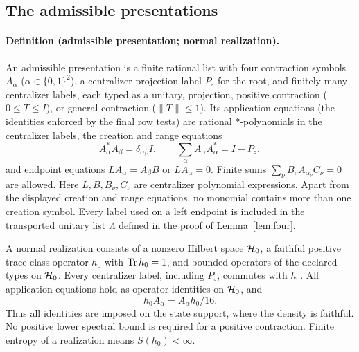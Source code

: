 \subsection{The admissible presentations}\label{sec:admissible}
\paragraph{Definition (admissible presentation; normal realization).}
An admissible presentation is a finite rational list with four contraction
symbols $A_\alpha$ ($\alpha\in\{0,1\}^2$), a centralizer projection label $P_{\circ}$ for the root, and
finitely many centralizer labels, each typed as a unitary, projection,
positive contraction ($0\leq T\leq I$), or general contraction ($\|T\|\leq1$).
Its application equations (the identities enforced by the final row tests) are rational $*$-polynomials in the centralizer
labels, the creation and range equations
\[
 A_\alpha^*A_\beta=\delta_{\alpha\beta}I,\qquad
 \sum_\alpha A_\alpha A_\alpha^*=I-P_{\circ},
\]
and endpoint equations $LA_\alpha=A_\beta B$ or $LA_\alpha=0$.
Finite sums $\sum_\nu B_\nu A_{\alpha_\nu}C_\nu=0$ are allowed.
Here $L,B,B_\nu,C_\nu$ are centralizer polynomial expressions. Apart from the displayed creation and range equations, no monomial contains
more than one creation symbol. Every label used on a left endpoint is
included in the transported unitary list $\Lambda$ defined in the proof of Lemma~\ref{lem:four}.

A normal realization consists of a nonzero Hilbert space $\mathcal H_0$, a faithful
positive trace-class operator $h_0$ with $\operatorname{Tr} h_0=1$, and bounded operators of
the declared types on $\mathcal H_0$. Every centralizer label, including $P_{\circ}$,
commutes with $h_0$. All application equations hold as operator identities
on $\mathcal H_0$, and
\[
 h_0A_\alpha=A_\alpha h_0/16.
\]
Thus all identities are imposed on the state support, where the density is
faithful. No positive lower spectral bound is required for a positive
contraction. Finite entropy of a realization means $S(h_0)<\infty$.

